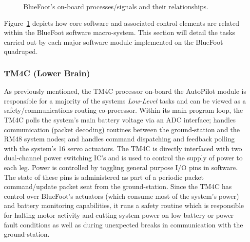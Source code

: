 		\begin{figure}[h!]
			\centering
			\caption{BlueFoot's on-board processes/signals and their relationships.}
			\label{fig::process_diagram}
		\end{figure}

		Figure~\ref{fig::process_diagram} depicts how core software and associated control elements are related within the BlueFoot software macro-system. This section will detail the tasks carried out by each major software module implemented on the BlueFoot quadruped.

		\subsubsection{TM4C (Lower Brain)}

			As previously mentioned, the TM4C processor on-board the AutoPilot module is responsible for a majority of the systems \emph{Low-Level} tasks and can be viewed as a safety/communications routing co-processor. Within its main program loop, the TM4C polls the system's main battery voltage via an ADC interface; handles communication (packet decoding) routines between the ground-station and the RM48 system nodes; and handles command dispatching and feedback polling with the system's 16 servo actuators. The TM4C is directly interfaced with two dual-channel power switching IC's and is used to control the supply of power to each leg. Power is controlled by toggling general purpose I/O pins in software. The state of these pins is administered as part of a periodic packet command/update packet sent from the ground-station. Since the TM4C has control over BlueFoot's actuators (which consume most of the system's power) and battery monitoring capabilities, it runs a safety routine which is responsible for halting motor activity and cutting system power on low-battery or power-fault conditions as well as during unexpected breaks in communication with the ground-station.

